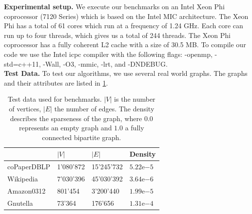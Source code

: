 \documentclass[letterpaper]{article}
\newcommand{\mypar}[1]{{\bf #1.}}
\begin{document}
\mypar{Experimental setup} 
We execute our benchmarks on an Intel Xeon Phi coprocessor (7120 Series) which is based on the Intel MIC architecture. The Xeon Phi has a total of 61 cores which run at a frequency of 1.24 GHz. Each core can run up to four threads, which gives us a total of 244 threads. The Xeon Phi coprocessor has a fully coherent L2 cache with a size of 30.5 MB. To compile our code we use the Intel icpc compiler with the following flags: -openmp, -std=c++11, -Wall, -O3, -mmic, -lrt, and -DNDEBUG.\\


\mypar{Test Data}
To test our algorithms, we use several real world graphs. The graphs and their attributes are listed in \ref{table:testdata}. 
\\
\begin{table}
\centering
\begin{tabular}{ |l|l|l|l| }
\hline
 & $\lvert V \rvert$ & $\lvert E \rvert$ & Density \\ \hline
coPaperDBLP & 1'080'872 & 15'245'732 & $5.22\mathrm{e}{-5}$ \\ \hline
Wikipedia & 7'030'396 & 45'030'392 & $3.64\mathrm{e}{-6}$ \\ \hline
Amazon0312 & 801'454 & 3'200'440 & $1.99\mathrm{e}{-5}$ \\ \hline
Gnutella & 73'364 & 176'656 & $1.31\mathrm{e}{-4}$ \\ \hline
\end{tabular}
\caption{Test data used for benchmarks. $\lvert V \rvert$ is the number of vertices, $\lvert E \rvert$ the number of edges. The density describes the sparseness of the graph, where $0.0$ represents an empty graph and $1.0$ a fully connected bipartite graph.}
\label{table:testdata}
\end{table}
\end{document}

